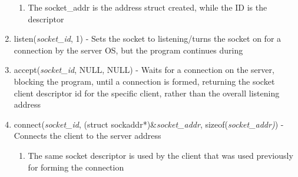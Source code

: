 \documentclass[11 pt, twoside]{article}
\begin{document}
\begin{enumerate}
\begin{enumerate}
\item The socket\_addr is the address struct created, while the ID is the descriptor
\end{enumerate}
\item listen(\textit{socket\_id}, 1) - Sets the socket to listening/turns the socket on for a connection by the server OS, but the program continues during
\item accept(\textit{socket\_id}, NULL, NULL) - Waits for a connection on the server, blocking the program, until a connection is formed, returning the socket client descriptor id for the specific client, rather than the overall listening address
\item connect(\textit{socket\_id}, (struct sockaddr*)\&\textit{socket\_addr}, sizeof(\textit{socket\_addr)}) - Connects the client to the server address
\begin{enumerate}
\item The same socket descriptor is used by the client that was used previously for forming the connection
\end{enumerate}
\end{enumerate}
\end{document}
